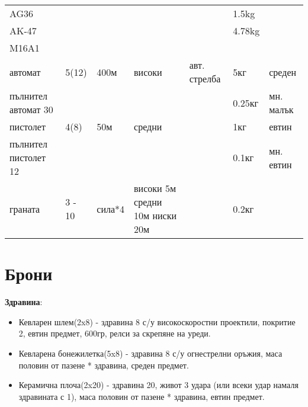 \begin{tabular}{p{2cm} | p{2cm} | p{2cm} | p{2cm} | p{2cm} | p{2cm} | p{2cm}}
AG36                  &                      &            &            &                & 1.5kg         &                  \\  %
AK-47                 &                      &            &            &                & 4.78kg        &                  \\  %
M16A1                 &                      &            &            &                &               &                  \\  %
%
автомат               & 5(12)                & 400м       & високи     & авт. стрелба   & 5кг           & среден           \\
пълнител автомат 30   &                      &            &            &                & 0.25кг        & мн. малък        \\
пистолет              & 4(8)                 & 50м        & средни     &                & 1кг           & евтин            \\  %
пълнител пистолет 12  &                      &            &            &                & 0.1кг         & мн. евтин        \\
граната               & 3 - 10               & сила*4     & високи 5м средни 10м ниски 20м & & 0.2кг    &                  \\

\end{tabular}

\section{Брони}
\textbf{Здравина}:
\begin{itemize}[topsep=-0cm, partopsep=0cm, parsep=0cm, itemsep=0cm]
\item{Кевларен шлем(2x8) - здравина 8 с/у високоскоростни проектили, покритие 2, евтин предмет, 600гр, релси за скрепяне на уреди.}
\item{Кевларена бонежилетка(5x8) - здравина 8 с/у огнестрелни оръжия, маса половин от пазене * здравина, среден предмет.}
\item{Керамична плоча(2x20) - здравина 20, живот 3 удара (или всеки удар намаля здравината с 1), маса половин от пазене * здравина, евтин предмет.}
\end{itemize}
